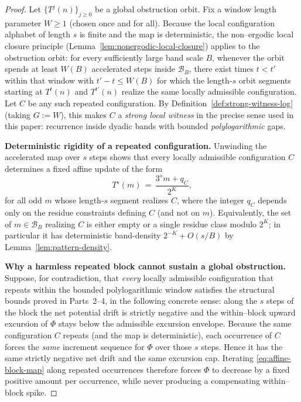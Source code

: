 \documentclass[preprint,12pt]{elsarticle}
\begin{document}
\begin{proof}
Let $\{T^j(n)\}_{j\ge 0}$ be a global obstruction orbit.
Fix a window length parameter $W\ge 1$ (chosen once and for all).
Because the local configuration alphabet of length $s$ is finite and the map is
deterministic, the non--ergodic local closure principle (Lemma~\ref{lem:nonergodic-local-closure})
applies to the obstruction orbit: for every sufficiently large band scale $B$,
whenever the orbit spends at least $W(B)$ accelerated steps inside $\mathcal{B}_B$,
there exist times $t<t'$ within that window with $t'-t\le W(B)$ for which the
length-$s$ orbit segments starting at $T^t(n)$ and $T^{t'}(n)$ realize the same
locally admissible configuration.
Let $C$ be any such repeated configuration.
By Definition~\ref{def:strong-witness-log} (taking $G:=W$), this makes $C$ a \emph{strong local witness} in the precise
sense used in this paper: recurrence inside dyadic bands with bounded \emph{polylogarithmic} gaps.

\smallskip
\noindent\textbf{Deterministic rigidity of a repeated configuration.}
Unwinding the accelerated map over $s$ steps shows that every locally admissible
configuration $C$ determines a fixed affine update of the form
\begin{equation}
\label{eq:affine-block-map}
T^s(m) \,=\, \frac{3^s m + q_C}{2^{K}},
\end{equation}
for all odd $m$ whose length-$s$ segment realizes $C$, where the integer
\(q_C\) depends only on the residue constraints defining $C$ (and not on $m$).
Equivalently, the set of $m\in\mathcal{B}_B$ realizing $C$ is either empty or a
single residue class modulo $2^K$; in particular it has deterministic
band-density \(2^{-K}+O(s/B)\) by Lemma~\ref{lem:pattern-density}.

\smallskip
\noindent\textbf{Why a harmless repeated block cannot sustain a global obstruction.}
Suppose, for contradiction, that \emph{every} locally admissible configuration
that repeats within the bounded polylogarithmic window satisfies the structural
bounds proved in Parts~2--4, in the following concrete sense: along the $s$
steps of the block the net potential drift is strictly negative and the within--block
upward excursion of $\Phi$ stays below the admissible excursion envelope.
Because the same configuration $C$ repeats (and the map is deterministic),
each occurrence of $C$ forces the \emph{same} increment sequence for $\Phi$
over those $s$ steps. Hence it has the same strictly negative net drift and
the same excursion cap.
Iterating \eqref{eq:affine-block-map} along repeated occurrences therefore forces
\(\Phi\) to decrease by a fixed positive amount per occurrence, while never
producing a compensating within--block spike.


\end{proof}
\end{document}
